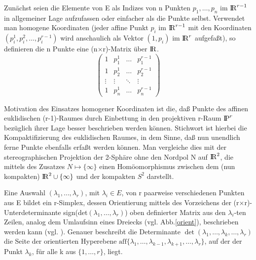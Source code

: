 Zunächst seien die Elemente von E als Indizes von n Punkten
$p_1,\ldots,p_n$ im $\R^{r-1}$ in allgemeiner Lage aufzufassen oder einfacher
als die Punkte selbst. Verwendet man homogene Koordinaten {(jeder affine Punkt
$p_i$ im $\R^{r-1}$ mit den Koordinaten $(p_i^1,p_i^2,\ldots,p_i^{r-1})$ wird
anschaulich als Vektor $(1,p_i)$ im $\R^r$ aufgefaßt)}, so definieren die n
Punkte eine (n$\times$r)-Matrix über $\R$.
$$\left(\begin{array}{cccc}
        1 & p_1^1 & \ldots & p_1^{r-1} \\
        1 & p_2^1 & \ldots & p_2^{r-1} \\
        \vdots & \vdots & \ddots & \vdots \\
        1 & p_n^1 & \ldots & p_n^{r-1} \end{array}\right)$$

{\scsi
Motivation des Einsatzes homogener Koordinaten ist die, daß Punkte des
affinen euklidischen (r-1)-Raumes durch Einbettung in den projektiven r-Raum
$\P^r$ bezüglich ihrer Lage besser beschrieben werden können. Stichwort
ist hierbei die Kompaktifizierung des euklidischen Raumes, in dem Sinne,
daß nun unendlich ferne Punkte ebenfalls erfaßt werden können. Man
vergleiche dies mit der stereographischen Projektion der 2-Sphäre ohne den
Nordpol N auf $\R^2$, die mittels des Zusatzes $N \mapsto \{\infty\}$ einen
Homöomorphismus zwischen dem (nun kompakten) $\R^2\cup\{\infty\}$ und der
kompakten $S^2$ darstellt.
}

Eine Auswahl $(\lambda_1,\ldots,\lambda_r)$, mit $\lambda_i\in E$, von r
paarweise verschiedenen Punkten aus E bildet ein r-Simplex, dessen
Orientierung mittels des Vorzeichens der (r$\times$r)-Unterdeterminante
sign(det$(\lambda_1,\ldots,\lambda_r)$) oben definierter Matrix aus den
$\lambda_i$-ten Zeilen, analog dem Umlaufsinn eines Dreiecks (vgl.
Abb.\ref{orient}), beschrieben werden kann (vgl. \cite{BoEg:91}).
Genauer beschreibt die Determinante
$\det(\lambda_1,\ldots,\lambda_k,\ldots,\lambda_r)$ die Seite der
orientierten Hyperebene
$\mbox{aff}\{\lambda_1,\ldots,\lambda_{k-1},\lambda_{k+1},\ldots,\lambda_r\}$,
auf der der Punkt $\lambda_k$, für alle k aus $\{1,\ldots,r\}$, liegt.

